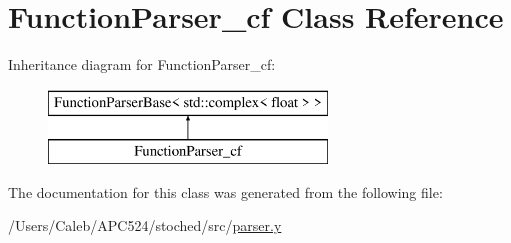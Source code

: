 \hypertarget{class_function_parser__cf}{}\section{Function\+Parser\+\_\+cf Class Reference}
\label{class_function_parser__cf}
Inheritance diagram for Function\+Parser\+\_\+cf\+:\begin{figure}[H]
\begin{center}
\leavevmode
\includegraphics[height=2.000000cm]{class_function_parser__cf}
\end{center}
\end{figure}


The documentation for this class was generated from the following file\+:\begin{DoxyCompactItemize}
\item 
/\+Users/\+Caleb/\+A\+P\+C524/stoched/src/\hyperlink{parser_8y}{parser.\+y}\end{DoxyCompactItemize}
